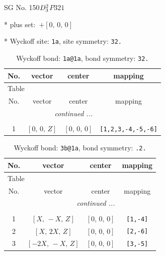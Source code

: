 \documentclass[fleqn,8pt]{jsarticle}
\begin{document}
\setcounter{MaxMatrixCols}{32}

\renewcommand{\tablename}{Table~}
\renewcommand{\figurename}{Figure~}
\begin{center}
\LARGE
SG No. 150\quad$D_{\rm 3}^{2}$\quad$P321$\quad[ trigonal ]
\end{center}

* plus set:\,\,\,$+\left[ 0,\, 0,\, 0 \right]$


* Wyckoff site: {\tt 1a}, site symmetry: {\tt 32.}
\renewcommand{\arraystretch}{1.2}
\begin{longtable}{cccc}
\caption{Wyckoff bond: {\tt 1a@1a}, bond symmetry: {\tt 32.}}
 \\
 \hline \hline
No. & vector & center & mapping \\ \hline \endfirsthead

\multicolumn{3}{l}{\tablename\ \thetable{}} \\
 \hline \hline
No. & vector & center & mapping \\ \hline \endhead

 \hline \hline
\multicolumn{3}{r}{\footnotesize\it continued ...} \\ \endfoot

 \hline \hline
\multicolumn{3}{r}{} \\ \endlastfoot

1 & $\left[ 0,\, 0,\, Z \right]$ & $\left[ 0,\, 0,\, 0 \right]$ & {\tt [1,2,3,-4,-5,-6]} \\
\end{longtable}
\renewcommand{\arraystretch}{1.2}
\begin{longtable}{cccc}
\caption{Wyckoff bond: {\tt 3b@1a}, bond symmetry: {\tt .2.}}
 \\
 \hline \hline
No. & vector & center & mapping \\ \hline \endfirsthead

\multicolumn{3}{l}{\tablename\ \thetable{}} \\
 \hline \hline
No. & vector & center & mapping \\ \hline \endhead

 \hline \hline
\multicolumn{3}{r}{\footnotesize\it continued ...} \\ \endfoot

 \hline \hline
\multicolumn{3}{r}{} \\ \endlastfoot

1 & $\left[ X,\, - X,\, Z \right]$ & $\left[ 0,\, 0,\, 0 \right]$ & {\tt [1,-4]} \\ \hline
2 & $\left[ X,\, 2 X,\, Z \right]$ & $\left[ 0,\, 0,\, 0 \right]$ & {\tt [2,-6]} \\ \hline
3 & $\left[ - 2 X,\, - X,\, Z \right]$ & $\left[ 0,\, 0,\, 0 \right]$ & {\tt [3,-5]} \\
\end{longtable}
\end{document}
